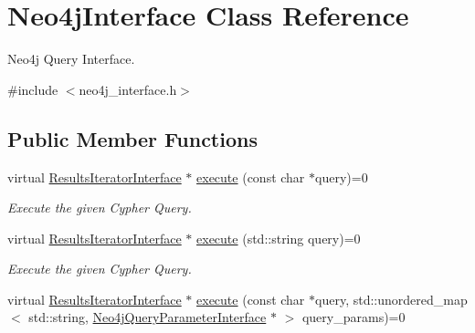 \hypertarget{classNeo4jInterface}{}\section{Neo4j\+Interface Class Reference}
\label{classNeo4jInterface}


Neo4j Query Interface.  




{\ttfamily \#include $<$neo4j\+\_\+interface.\+h$>$}

\subsection*{Public Member Functions}
\begin{DoxyCompactItemize}
\item 
virtual \hyperlink{classResultsIteratorInterface}{Results\+Iterator\+Interface} $\ast$ \hyperlink{classNeo4jInterface_a93992c994fc63856a1952d304f5030c3}{execute} (const char $\ast$query)=0\hypertarget{classNeo4jInterface_a93992c994fc63856a1952d304f5030c3}{}\label{classNeo4jInterface_a93992c994fc63856a1952d304f5030c3}

\begin{DoxyCompactList}\small\item\em Execute the given Cypher Query. \end{DoxyCompactList}\item 
virtual \hyperlink{classResultsIteratorInterface}{Results\+Iterator\+Interface} $\ast$ \hyperlink{classNeo4jInterface_a25908b6389132c27fdd0f93b2fed749f}{execute} (std\+::string query)=0\hypertarget{classNeo4jInterface_a25908b6389132c27fdd0f93b2fed749f}{}\label{classNeo4jInterface_a25908b6389132c27fdd0f93b2fed749f}

\begin{DoxyCompactList}\small\item\em Execute the given Cypher Query. \end{DoxyCompactList}\item 
virtual \hyperlink{classResultsIteratorInterface}{Results\+Iterator\+Interface} $\ast$ \hyperlink{classNeo4jInterface_abe7b55b502699a1d7681ef0a90626cdb}{execute} (const char $\ast$query, std\+::unordered\+\_\+map$<$ std\+::string, \hyperlink{classNeo4jQueryParameterInterface}{Neo4j\+Query\+Parameter\+Interface} $\ast$ $>$ query\+\_\+params)=0\hypertarget{classNeo4jInterface_abe7b55b502699a1d7681ef0a90626cdb}{}\label{classNeo4jInterface_abe7b55b502699a1d7681ef0a90626cdb}


\end{DoxyCompactItemize}

